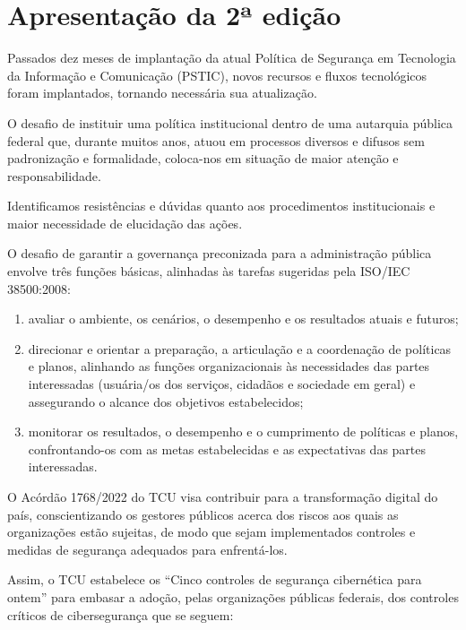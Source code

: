 \chapter[Apresentação da 2ª edição]{Apresentação da 2ª edição}

Passados dez meses de implantação da atual Política de Segurança em
Tecnologia da Informação e Comunicação (PSTIC), novos recursos e fluxos
tecnológicos foram implantados, tornando necessária sua atualização.

O desafio de instituir uma política institucional dentro de uma
autarquia pública federal que, durante muitos anos, atuou em processos
diversos e difusos sem padronização e formalidade, coloca-nos em
situação de maior atenção e responsabilidade.

Identificamos resistências e dúvidas quanto aos procedimentos
institucionais e maior necessidade de elucidação das ações.

O desafio de garantir a governança preconizada para a administração
pública envolve três funções básicas, alinhadas às tarefas sugeridas
pela ISO/IEC 38500:2008:

\begin{enumerate}
\item avaliar o ambiente, os cenários, o desempenho e os resultados atuais
    e futuros;

\item direcionar e orientar a preparação, a articulação e a coordenação de
    políticas e planos, alinhando as funções organizacionais às necessidades
    das partes interessadas (usuária/os dos serviços, cidadãos e sociedade
    em geral) e assegurando o alcance dos objetivos estabelecidos;

\item monitorar os resultados, o desempenho e o cumprimento de políticas e
    planos, confrontando-os com as metas estabelecidas e as expectativas das
    partes interessadas.
\end{enumerate}

O Acórdão 1768/2022 do TCU visa contribuir para a transformação digital
do país, conscientizando os gestores públicos acerca dos riscos aos
quais as organizações estão sujeitas, de modo que sejam implementados
controles e medidas de segurança adequados para enfrentá-los.

Assim, o TCU estabelece os ``Cinco controles de segurança cibernética
para ontem'' para embasar a adoção, pelas organizações públicas
federais, dos controles críticos de cibersegurança que se seguem:

